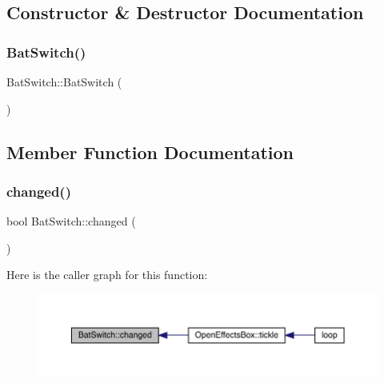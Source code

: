 \subsection{Constructor \& Destructor Documentation}
\mbox{\label{class_bat_switch_a77fa7a6d672398db8e44939ee1bce610}} 
\subsubsection{\texorpdfstring{Bat\+Switch()}{BatSwitch()}}
{\footnotesize\ttfamily Bat\+Switch\+::\+Bat\+Switch (\begin{DoxyParamCaption}{ }\end{DoxyParamCaption})}



\subsection{Member Function Documentation}
\mbox{\label{class_bat_switch_a4213173651fbb8c7fdcef12799318da4}} 
\subsubsection{\texorpdfstring{changed()}{changed()}}
{\footnotesize\ttfamily bool Bat\+Switch\+::changed (\begin{DoxyParamCaption}{ }\end{DoxyParamCaption})}

Here is the caller graph for this function\+:\nopagebreak
\begin{figure}[H]
\begin{center}
\leavevmode
\includegraphics[width=350pt]{class_bat_switch_a4213173651fbb8c7fdcef12799318da4_icgraph}
\end{center}
\end{figure}
\mbox{\label{class_bat_switch_af2180338890cebe52ff16427361383bd}} 
